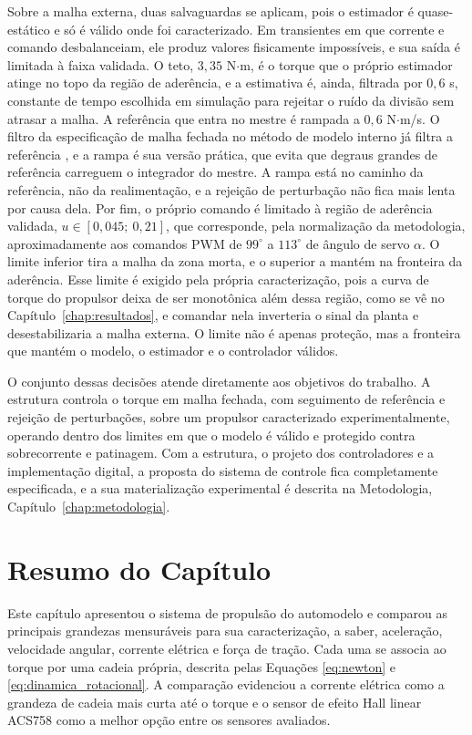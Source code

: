 Sobre a malha externa, duas salvaguardas se aplicam, pois o estimador é quase-estático e
só é válido onde foi caracterizado. Em transientes em que corrente e comando desbalanceiam,
ele produz valores fisicamente impossíveis, e sua saída é limitada à faixa
validada. O teto, $3{,}35$ N$\cdot$m, é o torque que o próprio estimador atinge no topo da
região de aderência, e a estimativa é, ainda, filtrada por $0{,}6$ s, constante de
tempo escolhida em simulação para rejeitar o ruído da divisão sem atrasar a malha. A
referência que entra no mestre é rampada a $0{,}6$ N$\cdot$m/s. O filtro da
especificação de malha fechada no método de modelo interno já filtra a referência
\cite{raffo_tcpi_imc}, e a rampa é sua versão prática, que evita que degraus grandes de
referência carreguem o integrador do mestre. A rampa está no caminho da referência, não
da realimentação, e a rejeição de perturbação não fica mais lenta por causa
dela. Por fim, o próprio comando é limitado à região de aderência validada,
$u \in [0{,}045;\ 0{,}21]$, que corresponde, pela normalização da metodologia,
aproximadamente aos comandos PWM de $99^\circ$ a $113^\circ$ de ângulo de servo $\alpha$. O limite inferior tira a malha da
zona morta, e o superior a mantém na fronteira da aderência. Esse limite é exigido pela
própria caracterização, pois a curva de torque do propulsor deixa de ser monotônica além
dessa região, como se vê no Capítulo~\ref{chap:resultados}, e comandar nela inverteria o
sinal da planta e desestabilizaria a malha externa. O limite não é apenas proteção, mas a fronteira que mantém o
modelo, o estimador e o controlador válidos.

O conjunto dessas decisões atende diretamente aos objetivos do trabalho. A estrutura
controla o torque em malha fechada, com seguimento de referência e rejeição de
perturbações, sobre um propulsor caracterizado experimentalmente, operando dentro dos
limites em que o
modelo é válido e protegido contra sobrecorrente e patinagem. Com a estrutura, o projeto
dos controladores e a implementação digital, a proposta do sistema de controle fica
completamente especificada, e a sua materialização experimental é descrita na Metodologia,
Capítulo~\ref{chap:metodologia}.

\section{Resumo do Capítulo}
\label{sec:resumocap2}

Este capítulo apresentou o sistema de propulsão do automodelo e comparou as principais grandezas
mensuráveis para sua caracterização, a saber, aceleração, velocidade angular, corrente elétrica e
força de tração. Cada uma se associa ao torque por uma cadeia própria, descrita pelas Equações
\eqref{eq:newton} e \eqref{eq:dinamica_rotacional}. A
comparação evidenciou a corrente elétrica como a grandeza de cadeia mais curta até o torque e o
sensor de efeito Hall linear ACS758 como a melhor opção entre os sensores avaliados.

